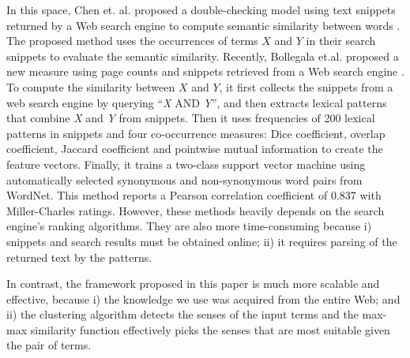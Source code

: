 In this space, Chen et. al. proposed a double-checking model using text
snippets returned by a Web search engine to compute semantic similarity between words
\cite{Chen:2006}. The proposed method uses the occurrences of terms $X$ and $Y$
in their search snippets to evaluate the semantic similarity.
Recently, Bollegala et.al. proposed a new measure using page counts and snippets
retrieved from a Web search engine \cite{Bollegala:2007, Bollegala:2011}.
To compute the similarity between $X$ and $Y$, it
first collects the snippets from a web search engine by querying
``\emph{X} AND \emph{Y}'', and then extracts lexical patterns that
combine \emph{X} and \emph{Y} from snippets.
Then it uses frequencies of 200 lexical patterns in snippets and four co-occurrence
measures: Dice coefficient, overlap coefficient, Jaccard coefficient and pointwise mutual information to create the feature vectors. Finally, it
trains a two-class support vector machine using automatically selected synonymous and non-synonymous word pairs from WordNet. This method
reports a Pearson correlation coefficient of 0.837 with Miller-Charles ratings.
However, these methods heavily depends on the search engine's ranking algorithms.
They are also more time-consuming because i) snippets and search results must be obtained
online; ii) it requires parsing of the returned text by the patterns.

In contrast, the framework proposed in this paper is much more scalable and effective,
because i) the knowledge we use was acquired from the entire Web; and
ii) the clustering algorithm detects the senses of the input terms
and the max-max similarity function effectively picks the senses that are most
suitable given the pair of terms.
